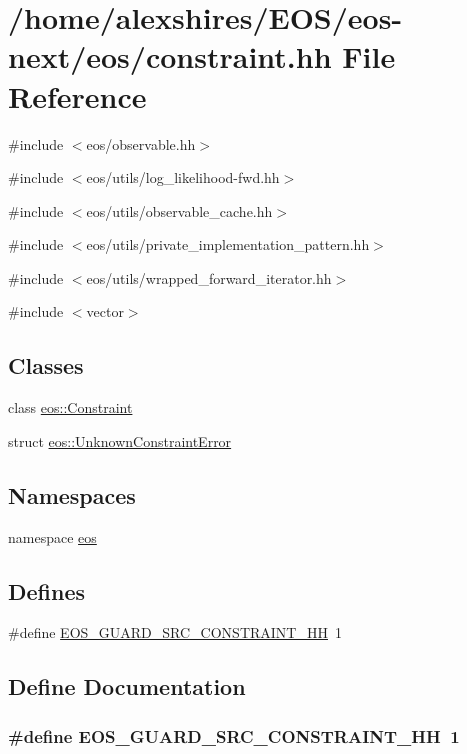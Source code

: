 \hypertarget{constraint_8hh}{
\section{/home/alexshires/EOS/eos-\/next/eos/constraint.hh File Reference}
\label{constraint_8hh}
}
{\ttfamily \#include $<$eos/observable.hh$>$}\par
{\ttfamily \#include $<$eos/utils/log\_\-likelihood-\/fwd.hh$>$}\par
{\ttfamily \#include $<$eos/utils/observable\_\-cache.hh$>$}\par
{\ttfamily \#include $<$eos/utils/private\_\-implementation\_\-pattern.hh$>$}\par
{\ttfamily \#include $<$eos/utils/wrapped\_\-forward\_\-iterator.hh$>$}\par
{\ttfamily \#include $<$vector$>$}\par
\subsection*{Classes}
\begin{DoxyCompactItemize}
\item 
class \hyperlink{classeos_1_1Constraint}{eos::Constraint}
\item 
struct \hyperlink{structeos_1_1UnknownConstraintError}{eos::UnknownConstraintError}
\end{DoxyCompactItemize}
\subsection*{Namespaces}
\begin{DoxyCompactItemize}
\item 
namespace \hyperlink{namespaceeos}{eos}
\end{DoxyCompactItemize}
\subsection*{Defines}
\begin{DoxyCompactItemize}
\item 
\#define \hyperlink{constraint_8hh_abe90181b1247bb83226d75c9e683cb96}{EOS\_\-GUARD\_\-SRC\_\-CONSTRAINT\_\-HH}~1
\end{DoxyCompactItemize}


\subsection{Define Documentation}
\hypertarget{constraint_8hh_abe90181b1247bb83226d75c9e683cb96}{
\subsubsection[{EOS\_\-GUARD\_\-SRC\_\-CONSTRAINT\_\-HH}]{\setlength{\rightskip}{0pt plus 5cm}\#define EOS\_\-GUARD\_\-SRC\_\-CONSTRAINT\_\-HH~1}}
\label{constraint_8hh_abe90181b1247bb83226d75c9e683cb96}
